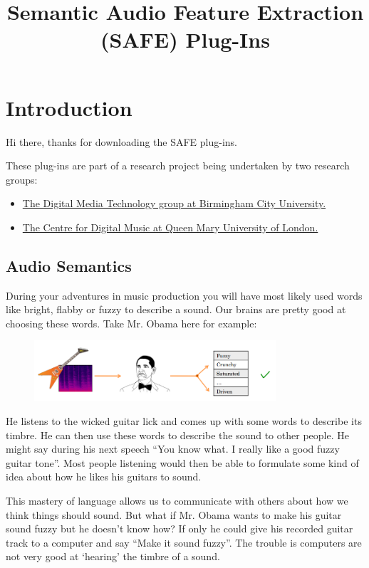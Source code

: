 \documentclass[a4paper]{article}
\title{Semantic Audio Feature Extraction (SAFE) Plug-Ins}
\author{}
\date{}
\begin{document}
\maketitle

\section*{Introduction}
	Hi there, thanks for downloading the SAFE plug-ins.

	These plug-ins are part of a research project being undertaken by two research groups:

	\begin{itemize}
		\item \href{http://www.bcu.ac.uk/tee/dmt/research}{The Digital Media Technology group at Birmingham City University.}

		\item \href{http://c4dm.eecs.qmul.ac.uk/}{The Centre for Digital Music at Queen Mary University of London.}
	\end{itemize}

	\subsection*{Audio Semantics}
		During your adventures in music production you will have most likely used words like bright, flabby or fuzzy to describe a sound. Our brains are pretty good at choosing these words. Take Mr. Obama here for example:

		\begin{figure}[h!]
			\centering
			\includegraphics[width=0.8\textwidth]{Images/Obama.png}
		\end{figure}

		He listens to the wicked guitar lick and comes up with some words to describe its timbre. He can then use these words to describe the sound to other people. He might say during his next speech ``You know what. I really like a good fuzzy guitar tone''. Most people listening would then be able to formulate some kind of idea about how he likes his guitars to sound.

		This mastery of language allows us to communicate with others about how we think things should sound. But what if Mr. Obama wants to make his guitar sound fuzzy but he doesn't know how? If only he could give his recorded guitar track to a computer and say ``Make it sound fuzzy''. The trouble is computers are not very good at `hearing' the timbre of a sound.
\end{document}
